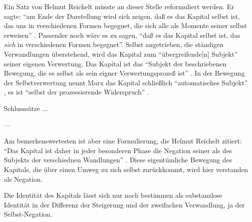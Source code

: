 \documentclass[12pt,
               DIV13,
               paper=a4,
               twoside=false,
               onehalfspacing,
               bibliography=totoc,
               toc=graduated,
               draft,
               ]{scrartcl}
\newcommand{\pc}[2]{\parencite[#1]{#2}}
\newcommand{\zn}[3]{\parencite[#1, zit. nach][#2]{#3}}
\newcommand{\worries}[1]{\ifdraft{\textcolor{blue}{\texttt{(#1)}}}{}}
\begin{document}

Ein Satz von Helmut Reichelt müsste an dieser Stelle reformuliert
werden. Er sagte: "`am Ende der Darstellung wird sich zeigen, daß es
das Kapital selbst ist, das uns in verschiedenen Formen begegnet, die
sich alle als Momente seiner selbst erweisen"' \pc{181}{reichelt}.
Passender noch wäre es zu sagen, "`daß es das Kapital selbst ist, das
\emph{sich} in verschiedenen Formen begegnet"'. Selbst angetrieben,
die ständigen Verwandlungen überstehend, wird das Kapital zum
"`übergreifende[n] Subjekt"' \pc{169}{kap} seiner eigenen Verwertung.
Das Kapital ist das "`Subjekt der beschriebenen Bewegung, die es
selbst als sein eigner Verwertungsprozeß ist"'
\zn{Marx}{181}{reichelt}. In der Bewegung der Selbstverwertung nennt
Marx das Kapital schließlich "`automatisches Subjekt"' \pc{169}{kap},
es ist "`selbst der prozessierende Widerspruch"' \pc{601}{grundr}.

Schlusssätze ...

---






Am bemerkenswertesten ist aber eine Formulierung, die Helmut Reichelt
zitiert: "`Das Kapital ist daher in jeder besonderen Phase die
Negation seiner als des Subjekts der verschiednen Wandlungen"'
\zn{Marx}{181}{reichelt}. Diese eigentümliche Bewegung des Kapitals,
die über einen Umweg zu sich selbst zurückkommt, wird hier verstanden
als Negation.

Die Identität des Kapitals lässt sich nur noch bestimmen als
substanzlose Identität in der Differenz der Steigerung und der
zweifachen Verwandlung, ja der Selbst-Negation. \worries{?}

\end{document}
